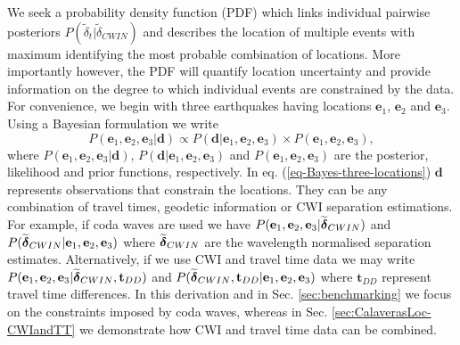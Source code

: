 \documentclass[extra]{gji}
\begin{document}
We seek a probability density function (PDF) which links
 individual pairwise posteriors $P(\widetilde{\delta}_t|\widetilde{\delta}_{CWIN})$
and describes the location of multiple events with maximum identifying
 the most probable combination of locations.
More importantly however, the PDF will
quantify location uncertainty and provide information
on the degree to which individual events are constrained
 by the data. For convenience, we begin with three earthquakes having locations
$\mathbf{e}_1$, $\mathbf{e}_2$ and $\mathbf{e}_3$. Using a Bayesian formulation we write
\begin{equation}
\label{eq-Bayes-three-locations}
P(\mathbf{e}_1, \mathbf{e}_2, \mathbf{e}_3| \mathbf{d}) \propto P( \mathbf{d}|\mathbf{e}_1, \mathbf{e}_2, \mathbf{e}_3)
\times P(\mathbf{e}_1, \mathbf{e}_2, \mathbf{e}_3),
\end{equation}
where $P(\mathbf{e}_1, \mathbf{e}_2, \mathbf{e}_3 | \mathbf{d})$, $P(\mathbf{d}|\mathbf{e}_1, \mathbf{e}_2, \mathbf{e}_3)$
and $P(\mathbf{e}_1, \mathbf{e}_2, \mathbf{e}_3)$ are the posterior,
likelihood and prior functions, respectively. In eq. (\ref{eq-Bayes-three-locations})
$\mathbf{d}$ represents observations that constrain the locations. They can be any combination
of travel times, geodetic information  or CWI separation estimations. For example, if coda waves are used
we have $P(\mathbf{e}_1, \mathbf{e}_2, \mathbf{e}_3 | \widetilde{\mitbf{\delta}}_{CWIN})$ and
$P(\widetilde{\mitbf{\delta}}_{CWIN}|\mathbf{e}_1, \mathbf{e}_2, \mathbf{e}_3)$
where $\widetilde{\mitbf{\delta}}_{CWIN}$ are the wavelength normalised separation estimates.
Alternatively, if we use CWI and travel time data we may write
$P(\mathbf{e}_1, \mathbf{e}_2, \mathbf{e}_3 | \widetilde{\mitbf{\delta}}_{CWIN}, \mathbf{t}_{DD})$ and
$P(\widetilde{\mitbf{\delta}}_{CWIN},\mathbf{t}_{DD}|\mathbf{e}_1, \mathbf{e}_2, \mathbf{e}_3)$
where $\mathbf{t}_{DD}$ represent travel time differences.
In this derivation and in Sec. \ref{sec:benchmarking} we focus on the constraints imposed by coda waves, whereas in
Sec. \ref{sec:CalaverasLoc-CWIandTT} we demonstrate how
CWI and travel time data can be combined.
\end{document}
